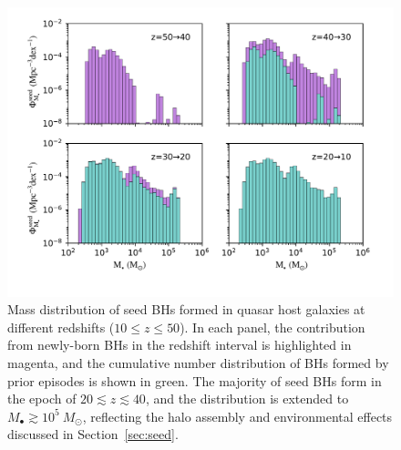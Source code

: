 \documentclass[twocolumn, twocolappendix]{aastex63}
\newcommand{\Msun}{M_\odot}
\begin{document}
\begin{CJK*}{UTF8}{gbsn}
\begin{figure}
\centering
\includegraphics[width=140mm]{seedBHMF_z.pdf}
\caption{
Mass distribution of seed BHs formed in quasar host galaxies at different redshifts ($10\leq z \leq 50$).
In each panel, the contribution from newly-born BHs in the redshift interval is highlighted in magenta,
and the cumulative number distribution of BHs formed by prior episodes is shown in green.
The majority of seed BHs form in the epoch of $20\lesssim z \lesssim 40$,
and the distribution is extended to $M_\bullet \gtrsim 10^5~\Msun$, 
reflecting the halo assembly and environmental effects discussed in Section~\ref{sec:seed}.
}
\label{fig:seedmf}
\vspace{5mm}
\end{figure}



\end{CJK*}
\end{document}
